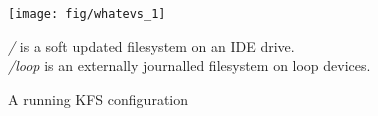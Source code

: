 \begin{figure}[htb]
  \centering
  \texttt{[image: fig/whatevs\_1]}
  \caption{A running KFS configuration}{{\it/} is a soft updated
    filesystem on an IDE drive.\\{\it/loop} is an externally journalled
    filesystem on loop devices.}
  \label{fig:kfs-graph}
\end{figure}
